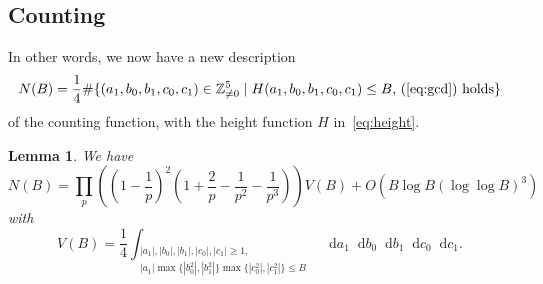 \documentclass[a4paper, twoside, 10pt]{amsart}
\newcommand*\diff{\mathop{}\!\mathrm{d}}
\newcommand{\ZZnz}{\mathbb{Z}_{\neq{}0}}
\newcommand{\abs}[1]{\left\lvert#1\right\rvert}
\newtheorem{lemma}[theorem]{Lemma}
\theoremstyle{definition}
\begin{document}
\subsection{Counting}\label{ssec:toric-counting}
In other words, we now have a new description
\[
  N(B)=\frac{1}{4}\#\{(a_1,b_0,b_1,c_0,c_1)\in\ZZnz^5 \mid H(a_1,b_0,b_1,c_0,c_1)\leq B \text{, (\ref{eq:gcd}) holds}\}
\]
of the counting function, with the height function $H$ in~\eqref{eq:height}.
\begin{lemma}
  We have
  \[
    N(B)=\prod_p\left(\left(1-\frac{1}{p}\right)^2\left(1+\frac{2}{p}-\frac{1}{p^2}-\frac{1}{p^3}\right)\right) V(B)+O(B \log B (\log\log B)^3)
  \]
  with
  \[
    V(B)=\frac{1}{4}
    \int_{\substack{\abs{a_1},\abs{b_0},\abs{b_1},\abs{c_0},\abs{c_1} \geq 1,\\\abs{a_1}\max\{\abs{b_0^2},\abs{b_1^2}\}\max\{\abs{c_0^2},\abs{c_1^2}\}\leq B}}
    \diff a_1 \diff b_0 \diff b_1 \diff c_0 \diff c_1\text{.}
  \]
\end{lemma}
\end{document}

